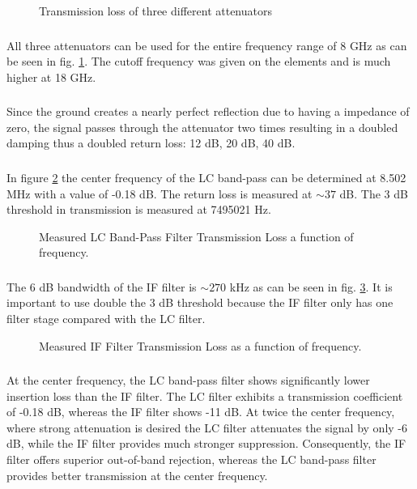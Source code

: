 \documentclass[a4paper,12pt]{article}
\begin{document}
	\begin{figure}[H]
		\centering
		
		\caption{Transmission loss of three different attenuators}%
		\label{fig:3510}
	\end{figure}
	
	\subsubsection{}
	
	All three attenuators can be used for the entire frequency range of 8 GHz as can be seen in fig. \ref{fig:3510}. The cutoff frequency was given on the elements and is much higher at 18 GHz.
	
	\subsubsection{}
	Since the ground creates a nearly perfect reflection due to having a impedance of zero, the signal passes through the attenuator two times resulting in a doubled damping thus a doubled return loss: 12 dB, 20 dB, 40 dB.
	\subsubsection{}
	In figure \ref{fig:3513} the center frequency of the LC band-pass can be determined at 8.502 MHz with a value of -0.18 dB. The return loss is measured at $\sim 37$ dB. The 3 dB threshold in transmission is measured at 7495021 Hz.
	\begin{figure}[H]
		\centering
		
		\caption{Measured LC Band-Pass Filter Transmission Loss a function of frequency.}
		\label{fig:3513}
	\end{figure}
	\subsubsection{}
	The  6 dB bandwidth of the IF filter is $\sim 270$ kHz as can be seen in fig. \ref{fig:3514}. It is important to use double the 3 dB threshold because the IF filter only has one filter stage compared with the LC filter.
			\begin{figure}[H]
		\centering
		
		\caption{Measured IF Filter Transmission Loss as a function of frequency.}
		\label{fig:3514}
	\end{figure}
	\subsubsection{}
	At the center frequency, the LC band-pass filter shows significantly lower insertion loss than the IF filter. The LC filter exhibits a transmission coefficient of -0.18 dB, whereas the IF filter shows -11 dB. At twice the center frequency, where strong attenuation is desired the LC filter attenuates the signal by only -6 dB, while the IF filter provides much stronger suppression. Consequently, the IF filter offers superior out-of-band rejection, whereas the LC band-pass filter provides better transmission at the center frequency.
	\vfill
	
		
	
	
	
	
\end{document}
